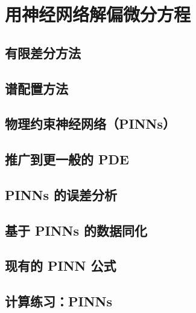 \chapter{用神经网络解偏微分方程}

\section{有限差分方法}

\section{谱配置方法}

\section{物理约束神经网络（PINNs）}

\section{推广到更一般的 PDE}

\section{PINNs 的误差分析}

\section{基于 PINNs 的数据同化}

\section{现有的 PINN 公式}

\section{计算练习：PINNs}

\newpage
